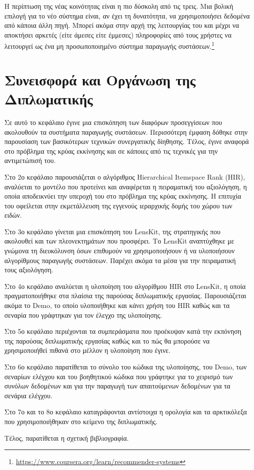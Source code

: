 Η περίπτωση της νέας κοινότητας είναι η πιο δύσκολη από τις τρεις. Μια βολική επιλογή για το νέο σύστημα είναι, αν έχει τη δυνατότητα, να χρησιμοποιήσει δεδομένα από κάποια άλλη πηγή. Μπορεί ακόμα στην αρχή της λειτουργίας του και μέχρι να αποκτήσει αρκετές (είτε άμεσες είτε έμμεσες) πληροφορίες από τους χρήστες να λειτουργεί ως ένα μη προσωποποιημένο σύστημα παραγωγής συστάσεων.\footnote{\en \url{https://www.coursera.org/learn/recommender-systems}}
\section{Συνεισφορά και Οργάνωση της Διπλωματικής}
Σε αυτό το κεφάλαιο έγινε μια επισκόπηση των διαφόρων προσεγγίσεων που ακολουθούν τα συστήματα παραγωγής συστάσεων. Περισσότερη έμφαση δόθηκε στην παρουσίαση των βασικότερων τεχνικών συνεργατικής δίηθησης. Τέλος, έγινε αναφορά στο πρόβλημα της κρύας εκκίνησης και σε κάποιες από τις τεχνικές για την αντιμετώπισή του.\par
Στο 2ο κεφάλαιο παρουσιάζεται ο αλγόριθμος {\en Hierarchical Itemspace Rank (HIR)}, αναλύεται το μοντέλο που προτείνει και αναφέρεται η πειραματική του αξιολόγηση, η οποία αποδεικνύει την υπεροχή του στο πρόβλημα της κρύας εκκίνησης. Η επιτυχία του οφείλεται στην εκμετάλλευση της εγγενούς ιεραρχικής δομής του χώρου των ειδών. \par
Στο 3ο κεφάλαιο γίνεται μια επισκόπηση του {\en LensKit}, της στρατηγικής που ακολουθεί και των πλεονεκτημάτων που προσφέρει. Το {\en LensKit} αναπτύχθηκε με γνώμονα τη διευκόλυνση όσων επιθυμούν να χρησιμοποιήσουν ή να υλοποιήσουν αλγορίθμους παραγωγής συστάσεων. Παρέχει ακόμα τα μέσα για την πειραματική τους αξιολόγηση.  \par
Στο 4ο κεφάλαιο αναλύεται η υλοποίηση του αλγορίθμου {\en HIR} στο {\en LensKit}, η οποία πραγματοποιήθηκε  στα πλαίσια της παρούσας διπλωματικής εργασίας. Παρουσιάζεται ακόμα το {\en Demo}, το οποίο υλοποιήθηκε και κάνει χρήση του {\en HIR} καθώς και τα σεναρία που γράφτηκαν για τον έλεγχο της υλοποίησης. \par
Στο 5ο κεφάλαιο περιέχονται τα συμπεράσματα που προέκυψαν κατά την εκπόνηση της παρούσας 
διπλωματικής εργασίας καθώς και το πώς θα μπορούσε να χρησιμοποιήθεί πιθανά στο μέλλον η υλοποίηση που έγινε. \par
Στο 6ο κεφάλαιο παρατίθεται το σύνολο του κώδικα της υλοποίησης, του {\en Demo}, των σεναρίων ελέγχου και του βοηθητικού κώδικα που γράφτηκε για το χειρισμό των συνόλων δεδομένων και για την παραγωγή των απαιτούμενων δεδομένων για τα σενάρια ελέγχου. \par
Στο 7ο και το 8ο κεφάλαιο καταγράφονται αντίστοιχα η ορολογία και τα αρκτικόλεξα που χρησιμοποιήθηκαν στο κείμενο της διπλωματικής. \par
Τέλος, παρατίθεται η σχετική βιβλιογραφία. 
